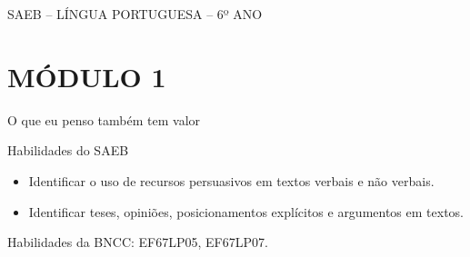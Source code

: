 SAEB -- LÍNGUA PORTUGUESA -- 6º ANO

\section{MÓDULO 1}

O que eu penso também tem valor

Habilidades do SAEB

\begin{itemize}
\tightlist
\item
  Identificar o uso de recursos persuasivos em textos verbais e não
  verbais.
\item
  Identificar teses, opiniões, posicionamentos explícitos e argumentos
  em textos.
\end{itemize}

Habilidades da BNCC: EF67LP05, EF67LP07.

